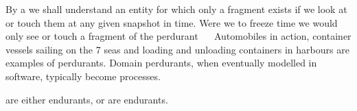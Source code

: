 { \sl%
%
\begynd
\pind By a  we shall understand an
      entity   
\begynd
\pind for which only a fragment exists\pos{}{\\} if we look at or
      touch them\pos{}{\\} at
      any given snapshot in time.
\pind Were we to freeze time we would only see or
      touch \pos{}{\\} a fragment of the perdurant
      \cite[]{OED} \eod \ \ 
\afslut
\afslut \rm Automobiles in action, container vessels sailing on the 7
     seas and loading and unloading containers in harbours are
     examples of perdurants. Domain perdurants, when eventually modelled in
     software, typically 
      become processes.} 
    
\begynd
\pind {} are
\begynd
\pind either  endurants, or are
\pind {} endurants.
\afslut


